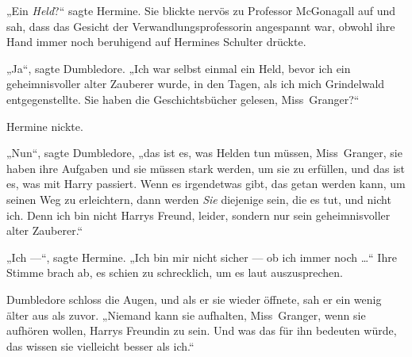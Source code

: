 „Ein \emph{Held}?“ sagte Hermine. Sie blickte nervös zu Professor McGonagall auf und sah, dass das Gesicht der Verwandlungsprofessorin angespannt war, obwohl ihre Hand immer noch beruhigend auf Hermines Schulter drückte.

„Ja“, sagte Dumbledore.
„Ich war selbst einmal ein Held, bevor ich ein geheimnisvoller alter Zauberer wurde, in den Tagen, als ich mich Grindelwald entgegenstellte. Sie haben die Geschichtsbücher gelesen, Miss~Granger?“

Hermine nickte.

„Nun“, sagte Dumbledore, „das ist es, was Helden tun müssen, Miss~Granger, sie haben ihre Aufgaben und sie müssen stark werden, um sie zu erfüllen, und das ist es, was mit Harry passiert. Wenn es irgendetwas gibt, das getan werden kann, um seinen Weg zu erleichtern, dann werden \emph{Sie} diejenige sein, die es tut, und nicht ich. Denn ich bin nicht Harrys Freund, leider, sondern nur sein geheimnisvoller alter Zauberer.“

„Ich —“, sagte Hermine.
„Ich bin mir nicht sicher — ob ich immer noch …“ Ihre Stimme brach ab, es schien zu schrecklich, um es laut auszusprechen.

Dumbledore schloss die Augen, und als er sie wieder öffnete, sah er ein wenig älter aus als zuvor.
„Niemand kann sie aufhalten, Miss~Granger, wenn sie aufhören wollen, Harrys Freundin zu sein. Und was das für ihn bedeuten würde, das wissen sie vielleicht besser als ich.“

